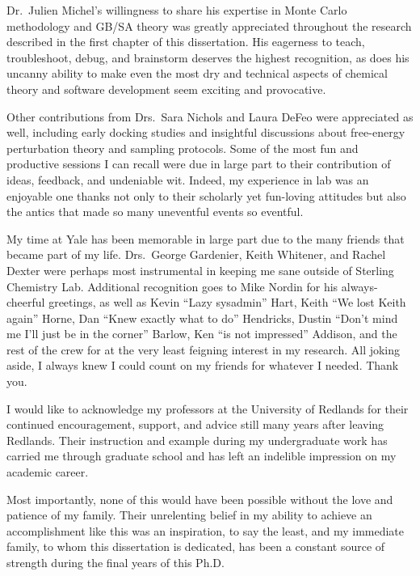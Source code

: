 \documentclass[12pt]{report}
\begin{document}
Dr.\ Julien Michel's willingness to share his expertise in Monte Carlo methodology and GB/SA theory was greatly appreciated throughout the research described in the first chapter of this dissertation. His eagerness to teach, troubleshoot, debug, and brainstorm deserves the highest recognition, as does his uncanny ability to make even the most dry and technical aspects of chemical theory and software development seem exciting and provocative. 

Other contributions from Drs.\ Sara Nichols and Laura DeFeo were appreciated as well, including early docking studies and insightful discussions about free-energy perturbation theory and sampling protocols.  Some of the most fun and productive sessions I can recall were due in large part to their contribution of ideas, feedback, and undeniable wit. Indeed, my experience in lab was an enjoyable one thanks not only to their scholarly yet fun-loving attitudes but also the antics that made so many uneventful events so eventful. 

My time at Yale has been memorable in large part due to the many friends that became part of my life. Drs.\ George Gardenier, Keith Whitener, and Rachel Dexter were perhaps most instrumental in keeping me sane outside of Sterling Chemistry Lab. Additional recognition goes to Mike Nordin for his always-cheerful greetings, as well as Kevin ``Lazy sysadmin'' Hart, Keith ``We lost Keith again'' Horne, Dan ``Knew exactly what to do'' Hendricks, Dustin ``Don't mind me I'll just be in the corner'' Barlow, Ken ``is not impressed'' Addison, and the rest of the crew for at the very least feigning interest in my research. All joking aside, I always knew I could count on my friends for whatever I needed. Thank you.

I would like to acknowledge my professors at the University of Redlands for their continued encouragement, support, and advice still many years after leaving Redlands. Their instruction and example during my undergraduate work has carried me through graduate school and has left an indelible impression on my academic career.

Most importantly, none of this would have been possible without the love and patience of my family. Their unrelenting belief in my ability to achieve an accomplishment like this was an inspiration, to say the least, and my immediate family, to whom this dissertation is dedicated, has been a constant source of strength during the final years of this Ph.D.

\end{document}
